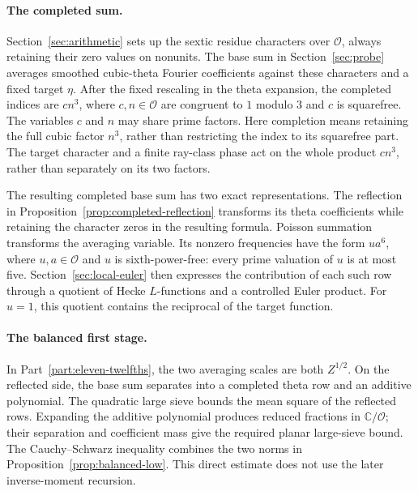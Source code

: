 \paragraph{The completed sum.}
Section~\ref{sec:arithmetic} sets up the sextic residue characters over
$\mathcal O$, always retaining their zero values on nonunits. The base
sum in Section~\ref{sec:probe} averages smoothed cubic-theta Fourier
coefficients against these characters and a fixed target $\eta$.
After the fixed rescaling in the theta expansion, the completed indices
are $cn^3$, where $c,n\in\mathcal O$ are congruent to $1$ modulo $3$ and
$c$ is squarefree. The variables $c$ and $n$ may share prime factors.
Here completion means retaining the full cubic factor $n^3$, rather than
restricting the index to its squarefree part.
The target character and a finite ray-class phase act on the whole product
$cn^3$, rather than separately on its two factors.

The resulting completed base sum has two exact representations.
The reflection in Proposition~\ref{prop:completed-reflection}
transforms its theta coefficients while retaining the character zeros in
the resulting formula.
Poisson summation transforms the averaging variable. Its nonzero frequencies
have the form $ua^6$, where $u,a\in\mathcal O$ and $u$ is sixth-power-free:
every prime valuation of $u$ is at most five.
Section~\ref{sec:local-euler}
then expresses the contribution of each such row through a quotient of
Hecke $L$-functions and a controlled Euler product. For $u=1$, this
quotient contains the reciprocal of the target function.

\paragraph{The balanced first stage.}
In Part~\ref{part:eleven-twelfths}, the two averaging scales are both
$Z^{1/2}$. On the reflected side, the base sum separates into a completed
theta row and an additive polynomial. The quadratic large sieve bounds
the mean square of the reflected rows. Expanding the additive polynomial
produces reduced fractions in $\mathbb C/\mathcal O$; their separation and
coefficient mass give the required planar large-sieve bound. The
Cauchy--Schwarz inequality combines the two norms in
Proposition~\ref{prop:balanced-low}.
This direct estimate does not use the later inverse-moment recursion.

